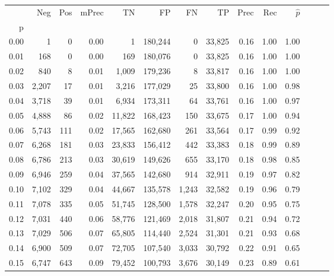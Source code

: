 \begin{tabular}{rrrrrrrrrrrrrr}
\toprule
{} &    Neg &  Pos & mPrec &       TN &       FP &      FN &      TP &  Prec &   Rec & $\hat{p}$ \\
p    &        &      &       &          &          &         &         &       &       &           \\
\midrule
0.00 &      1 &    0 &  0.00 &        1 &  180,244 &       0 &  33,825 &  0.16 &  1.00 &      1.00 \\
0.01 &    168 &    0 &  0.00 &      169 &  180,076 &       0 &  33,825 &  0.16 &  1.00 &      1.00 \\
0.02 &    840 &    8 &  0.01 &    1,009 &  179,236 &       8 &  33,817 &  0.16 &  1.00 &      1.00 \\
0.03 &  2,207 &   17 &  0.01 &    3,216 &  177,029 &      25 &  33,800 &  0.16 &  1.00 &      0.98 \\
0.04 &  3,718 &   39 &  0.01 &    6,934 &  173,311 &      64 &  33,761 &  0.16 &  1.00 &      0.97 \\
0.05 &  4,888 &   86 &  0.02 &   11,822 &  168,423 &     150 &  33,675 &  0.17 &  1.00 &      0.94 \\
0.06 &  5,743 &  111 &  0.02 &   17,565 &  162,680 &     261 &  33,564 &  0.17 &  0.99 &      0.92 \\
0.07 &  6,268 &  181 &  0.03 &   23,833 &  156,412 &     442 &  33,383 &  0.18 &  0.99 &      0.89 \\
0.08 &  6,786 &  213 &  0.03 &   30,619 &  149,626 &     655 &  33,170 &  0.18 &  0.98 &      0.85 \\
0.09 &  6,946 &  259 &  0.04 &   37,565 &  142,680 &     914 &  32,911 &  0.19 &  0.97 &      0.82 \\
0.10 &  7,102 &  329 &  0.04 &   44,667 &  135,578 &   1,243 &  32,582 &  0.19 &  0.96 &      0.79 \\
0.11 &  7,078 &  335 &  0.05 &   51,745 &  128,500 &   1,578 &  32,247 &  0.20 &  0.95 &      0.75 \\
0.12 &  7,031 &  440 &  0.06 &   58,776 &  121,469 &   2,018 &  31,807 &  0.21 &  0.94 &      0.72 \\
0.13 &  7,029 &  506 &  0.07 &   65,805 &  114,440 &   2,524 &  31,301 &  0.21 &  0.93 &      0.68 \\
0.14 &  6,900 &  509 &  0.07 &   72,705 &  107,540 &   3,033 &  30,792 &  0.22 &  0.91 &      0.65 \\
0.15 &  6,747 &  643 &  0.09 &   79,452 &  100,793 &   3,676 &  30,149 &  0.23 &  0.89 &      0.61 \\

\end{tabular}
